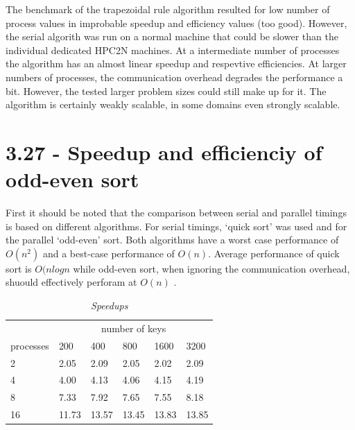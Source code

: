 \documentclass[a4paper,11pt,twoside]{article}
\begin{document}
The benchmark of the trapezoidal rule algorithm resulted for low number of process values in improbable speedup and efficiency values (too good). However, the serial algorith was run on a normal machine that could be slower than the individual dedicated HPC2N machines. At a intermediate number of processes the algorithm has an almost linear speedup and respevtive efficiencies. At larger numbers of processes, the communication overhead degrades the performance a bit. However, the tested larger problem sizes could still make up for it. The algorithm is certainly weakly scalable, in some domains even strongly scalable.  

\section{3.27 - Speedup and efficienciy of odd-even sort}
First it should be noted that the comparison between serial and parallel timings is based on different algorithms. For serial timings, `quick sort' was used and for the parallel `odd-even' sort. Both algorithms have a worst case performance of $O(n^{2})$ and a best-case performance of $O(n)$. Average performance of quick sort is $O(n log n$ while odd-even sort, when ignoring the communication overhead, shuould effectively perforam at $O(n)$ \cite{hanke_kth}. 

\begin{table}[]
\centering
\caption{\textit{Speedups}}
\label{tab:speedups}
\begin{tabular}{llllll}
\multicolumn{1}{l|}{}          & \multicolumn{5}{c}{number of keys}                                                                                 \\ \cline{2-6} 
\multicolumn{1}{l|}{processes} & \multicolumn{1}{l|}{200} & \multicolumn{1}{l|}{400} & \multicolumn{1}{l|}{800} & \multicolumn{1}{l|}{1600} & 3200  \\ \hline
2                              & 2.05                     & 2.09                     & 2.05                     & 2.02                      & 2.09  \\
4                              & 4.00                     & 4.13                     & 4.06                     & 4.15                      & 4.19  \\
8                              & 7.33                     & 7.92                     & 7.65                     & 7.55                      & 8.18  \\
16                             & 11.73                    & 13.57                    & 13.45                    & 13.83                     & 13.85
\end{tabular}
\end{table}
\end{document}
